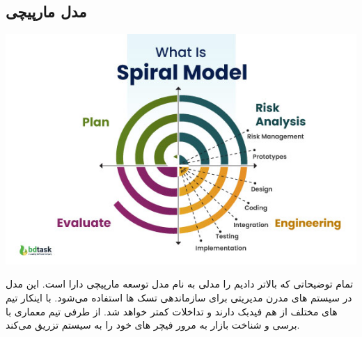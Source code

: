 \subsection{مدل مارپیچی}
\includegraphics{assets/spiral_model.jpg}

تمام توضیحاتی که بالاتر دادیم را مدلی به نام مدل توسعه مارپیچی دارا است. این مدل در سیستم های مدرن مدیریتی برای سازماندهی تسک ها استفاده می‌شود.
با اینکار تیم های مختلف از هم فیدبک دارند و تداخلات کمتر خواهد شد. از طرفی تیم معماری با برسی و شناخت بازار به مرور فیچر های خود را به سیستم تزریق می‌کند.

